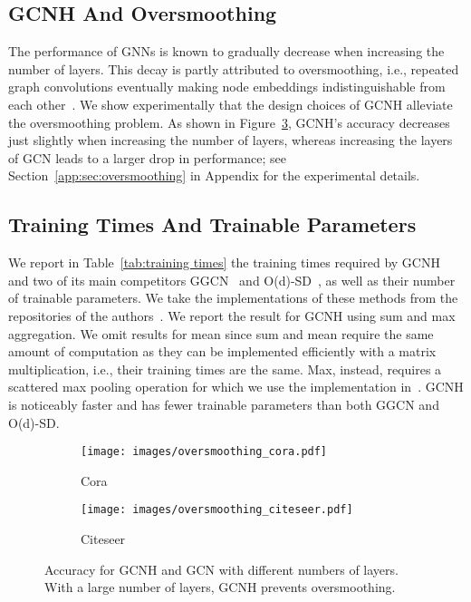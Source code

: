 \documentclass[conference]{IEEEtran}
\begin{document}
\subsection{GCNH And Oversmoothing}
\label{sec:oversmoothing}
The performance of GNNs is known to gradually decrease when increasing the number of layers. This decay is partly attributed to oversmoothing, i.e., repeated graph convolutions eventually making node embeddings indistinguishable from each other~\cite{li_insights_2018, oono_graph_2020}.
We show experimentally that the design choices of GCNH  alleviate the oversmoothing problem. As shown in Figure~\ref{fig:oversmoothing}, GCNH's accuracy decreases just slightly when increasing the number of layers, whereas increasing the layers of GCN leads to a larger drop in performance; see Section~\ref{app:sec:oversmoothing} in Appendix for the experimental details.

\subsection{Training Times And Trainable Parameters}
\label{sec:training_times}
We report in Table~\ref{tab:training times} the training times required by GCNH and two of its main competitors GGCN~\cite{yan_two_2021} and O(d)-SD~\cite{bodnar_neural_2022}, as well as their number of trainable parameters. 
We take the implementations of these methods from the repositories of the authors~\cite{yujun-yan-code,neural-sheaf-diffusion-code}.
We report the result for GCNH using sum and max aggregation. We omit results for mean since sum and mean require the same amount of computation as they can be implemented efficiently with a matrix multiplication, i.e., their training times are the same. Max, instead, requires a scattered max pooling operation for which we use the implementation in~\cite{pytorch-scatter}.
GCNH is noticeably faster and has fewer trainable parameters than both GGCN and O(d)-SD.


\begin{figure}
\begin{subfigure}{.24\textwidth}

    \texttt{[image: images/oversmoothing\_cora.pdf]}
    \caption{Cora}
    \label{fig:oversmoothing_cora}
    \end{subfigure}
\hfill
\begin{subfigure}{.24\textwidth}
    \texttt{[image: images/oversmoothing\_citeseer.pdf]}
    \caption{Citeseer}
    \label{fig:oversmoothing_citeseer}
\end{subfigure}


\caption{Accuracy for GCNH and GCN with different numbers of layers. With a large number of layers, GCNH prevents oversmoothing.}
\label{fig:oversmoothing}
\end{figure}
\end{document}
